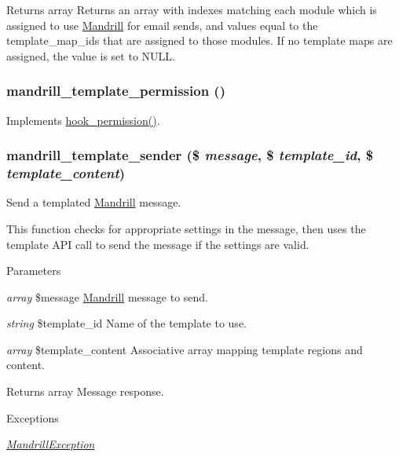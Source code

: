 \begin{DoxyReturn}{Returns}
array Returns an array with indexes matching each module which is assigned to use \hyperlink{classMandrill}{Mandrill} for email sends, and values equal to the template\_\-map\_\-ids that are assigned to those modules. If no template maps are assigned, the value is set to NULL. 
\end{DoxyReturn}
\hypertarget{mandrill__template_8module_ae1d3285f08ccd1416a34b0f0c5276c64}{
\subsubsection[{mandrill\_\-template\_\-permission}]{\setlength{\rightskip}{0pt plus 5cm}mandrill\_\-template\_\-permission ()}}
\label{mandrill__template_8module_ae1d3285f08ccd1416a34b0f0c5276c64}
Implements \hyperlink{group__hooks_ga2b22b45f4925f2478412477bae329713}{hook\_\-permission()}. \hypertarget{mandrill__template_8module_aa9e98789848a212268bd3978937a7c54}{
\subsubsection[{mandrill\_\-template\_\-sender}]{\setlength{\rightskip}{0pt plus 5cm}mandrill\_\-template\_\-sender (\$ {\em message}, \/  \$ {\em template\_\-id}, \/  \$ {\em template\_\-content})}}
\label{mandrill__template_8module_aa9e98789848a212268bd3978937a7c54}
Send a templated \hyperlink{classMandrill}{Mandrill} message.

This function checks for appropriate settings in the message, then uses the template API call to send the message if the settings are valid.


\begin{DoxyParams}{Parameters}
\item[{\em array}]\$message \hyperlink{classMandrill}{Mandrill} message to send. \item[{\em string}]\$template\_\-id Name of the template to use. \item[{\em array}]\$template\_\-content Associative array mapping template regions and content.\end{DoxyParams}
\begin{DoxyReturn}{Returns}
array Message response.
\end{DoxyReturn}

\begin{DoxyExceptions}{Exceptions}
\item[{\em \hyperlink{classMandrillException}{MandrillException}}]\end{DoxyExceptions}
